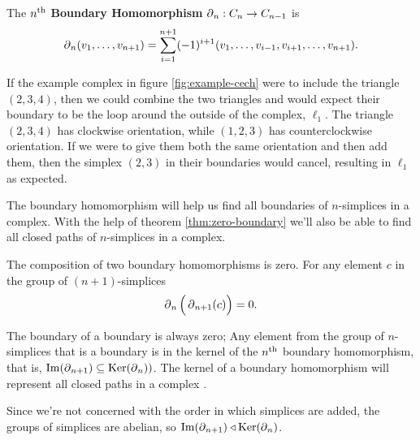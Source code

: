 \begin{definition}\label{def:boundary-homomorphism}
    The \(n\textsuperscript{th}\) \textbf{Boundary Homomorphism} \(\operatorname{\partial}_n : C_n \to C_{n-1}\) is
    \[
        \operatorname{\partial}_n (v_1,\dots , v_{n+1}) = \sum_{i=1}^{n+1} (-1)^{i+1}
        (v_1,\dots, v_{i-1}, v_{i+1}, \dots, v_{n+1})
        .
    \]
    \cite{hatcher}
\end{definition}


\begin{example}
    If the example complex in figure \ref{fig:example-cech} were to include the triangle \((2,3,4)\), then we could combine the two triangles and would expect their boundary to be the loop around the outside of the complex, \(\ell_1\). The triangle \((2,3,4)\) has clockwise orientation, while \((1,2,3)\) has counterclockwise orientation. If we were to give them both the same orientation and then add them, then the simplex \((2,3)\) in their boundaries would cancel, resulting in \(\ell_1\) as expected.
\end{example}

The boundary homomorphism will help us find all boundaries of \(n\)-simplices in a complex. With the help of theorem \ref{thm:zero-boundary} we'll also be able to find all closed paths of \(n\)-simplices in a complex.

\begin{theorem}\label{thm:zero-boundary}
    The composition of two boundary homomorphisms is zero. For any element \(c\) in the group of \((n+1)\)-simplices
    \begin{align*}
        \operatorname{\partial}_{n} \Big( \operatorname{\partial}_{n+1} (c) \Big) = 0
        .
    \end{align*}
\end{theorem}

The boundary of a boundary is always zero;
Any element from the group of \(n\)-simplices that is a boundary is in the kernel of the \(n\textsuperscript{th}\) boundary homomorphism, that is, \(\operatorname{Im}(\operatorname{\partial}_{n+1}) \subseteq \operatorname{Ker}(\operatorname{\partial}_n))\).
The kernel of a boundary homomorphism will represent all closed paths in a complex .


Since we're not concerned with the order in which simplices are added, the groups of simplices are abelian, so \(\operatorname{Im}(\operatorname{\partial}_{n+1}) \triangleleft \operatorname{Ker}(\operatorname{\partial}_{n})  \).

